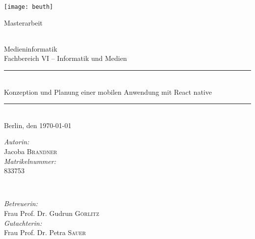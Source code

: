 \begin{titlepage}


\center %


\begin{center}
\texttt{[image: beuth]}  \\[2cm]
\end{center}

\begin{Large}
Masterarbeit
\end{Large}\\[0.4cm]
\LARGE{Medieninformatik}\\
\large{Fachbereich VI -- Informatik und Medien}\\[0.5cm]


\rule{\textwidth}{0.4pt}\\[1cm] %
{\LARGE Konzeption und Planung einer mobilen Anwendung mit React native}\\[\baselineskip]

\rule{\textwidth}{0.4pt}\\[1cm]%

{\Large Berlin, den \today{}} %
\vfill


\begin{minipage}{0.4\textwidth}
\begin{flushleft} \large
\emph{Autorin:}\\
Jacoba \textsc{Brandner} \\
\emph{Matrikelnummer:}\\
833753
\end{flushleft}
\end{minipage}
~
\begin{minipage}{0.45\textwidth}
\begin{flushright} \large
\emph{Betreuerin:} \\
Frau Prof. Dr. Gudrun \textsc{Görlitz} \\
\emph{Gutachterin:} \\
Frau Prof. Dr. Petra \textsc{Sauer} \\
\end{flushright}
\end{minipage}


\vfill %
\end{titlepage}
